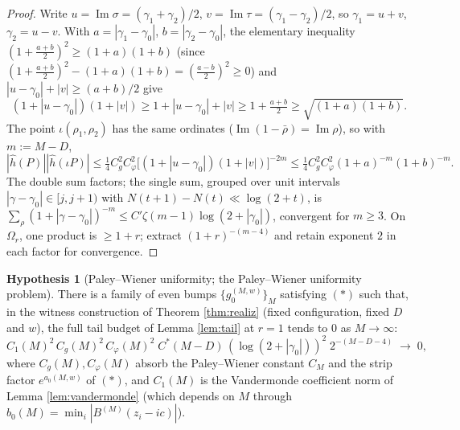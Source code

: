 \documentclass[11pt,reqno]{amsart}
\theoremstyle{definition}
\newtheorem{assumption}[theorem]{Hypothesis}
\begin{document}
\begin{proof}
Write \(u=\operatorname{Im}\sigma=(\gamma_1+\gamma_2)/2\),
\(v=\operatorname{Im}\tau=(\gamma_1-\gamma_2)/2\), so \(\gamma_1=u+v\),
\(\gamma_2=u-v\). With \(a=|\gamma_1-\gamma_0|\), \(b=|\gamma_2-\gamma_0|\), the
elementary inequality \((1+\tfrac{a+b}2)^2\geq(1+a)(1+b)\) (since
\((1+\tfrac{a+b}2)^2-(1+a)(1+b)=(\tfrac{a-b}2)^2\geq0\)) and
\(|u-\gamma_0|+|v|\geq(a+b)/2\) give
\[
(1+|u-\gamma_0|)(1+|v|)\geq 1+|u-\gamma_0|+|v|\geq1+\tfrac{a+b}2
\geq\sqrt{(1+a)(1+b)}.
\]
The point \(\iota(\rho_1,\rho_2)\) has the same ordinates
(\(\operatorname{Im}(1-\bar\rho)=\operatorname{Im}\rho\)), so with \(m:=M-D\),
\[
|\hat h(P)||\hat h(\iota P)|\leq\tfrac14 C_g^2C_\varphi^2
\bigl[(1+|u-\gamma_0|)(1+|v|)\bigr]^{-2m}
\leq\tfrac14 C_g^2C_\varphi^2(1+a)^{-m}(1+b)^{-m}.
\]
The double sum factors; the single sum, grouped over unit intervals
\(|\gamma-\gamma_0|\in[j,j+1)\) with \(N(t+1)-N(t)\ll\log(2+t)\), is
\(\sum_\rho(1+|\gamma-\gamma_0|)^{-m}\leq C'\zeta(m-1)\log(2+|\gamma_0|)\),
convergent for \(m\geq3\). On \(\Omega_r\), one product is \(\geq1+r\); extract
\((1+r)^{-(m-4)}\) and retain exponent \(2\) in each factor for convergence.
\end{proof}

\begin{assumption}[Paley--Wiener uniformity; the Paley--Wiener uniformity problem]\label{hyp:pw}
There is a family of even bumps \(\{g_0^{(M,w)}\}_M\) satisfying \((\ast)\)
such that, in the witness construction of Theorem \ref{thm:realiz} (fixed
configuration, fixed \(D\) and \(w\)), the full tail budget of Lemma
\ref{lem:tail} at \(r=1\) tends to \(0\) as \(M\to\infty\):
\[
C_1(M)^2\,C_g(M)^2\,C_\varphi(M)^2\;
C^*(M-D)\,(\log(2+|\gamma_0|))^2\;2^{-(M-D-4)}\;\longrightarrow\;0,
\]
where \(C_g(M),C_\varphi(M)\) absorb the Paley--Wiener constant \(C_M\) and the
strip factor \(e^{a_0(M,w)}\) of \((\ast)\), and \(C_1(M)\) is the Vandermonde
coefficient norm of Lemma \ref{lem:vandermonde} (which depends on \(M\) through
\(b_0(M)=\min_i|B^{(M)}(z_i-ic)|\)).
\end{assumption}
\end{document}
